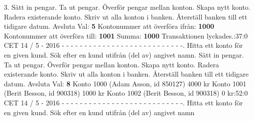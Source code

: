 \begin{multicols}{2}
3.   Sätt in pengar.   Ta ut pengar.   Överför pengar mellan konton.   Skapa nytt konto.   Radera existerande konto.   Skriv ut alla konton i banken.   Återställ banken till ett tidigare datum. Avsluta\newline
Val: \textbf{5}\newline
Kontonummer att överföra ifrån: \textbf{1000}\newline
Kontonummer att överföra till: \textbf{1001}\newline
Summa: \textbf{1000}\newline
Transaktionen lyckades.:37:0 CET 14 / 5 - 2016\newline
- - - - - - - - - - - - - - - - - - - - - - - - - - -.   Hitta ett konto för en given kund.   Sök efter en kund utifrån (del av) angivet namn.   Sätt in pengar.   Ta ut pengar.   Överför pengar mellan konton.   Skapa nytt konto.   Radera existerande konto.   Skriv ut alla konton i banken.   Återställ banken till ett tidigare datum. Avsluta\newline
Val: \textbf{8}\newline
Konto 1000 (Adam Asson, id 850127) 4000 kr\newline
Konto 1001 (Berit Besson, id 900318) 1000 kr\newline
Konto 1002 (Berit Besson, id 900318) 0 kr:52:0 CET 14 / 5 - 2016\newline
- - - - - - - - - - - - - - - - - - - - - - - - - - -.   Hitta ett konto för en given kund.   Sök efter en kund utifrån (del av) angivet namn\newline

\end{multicols}
